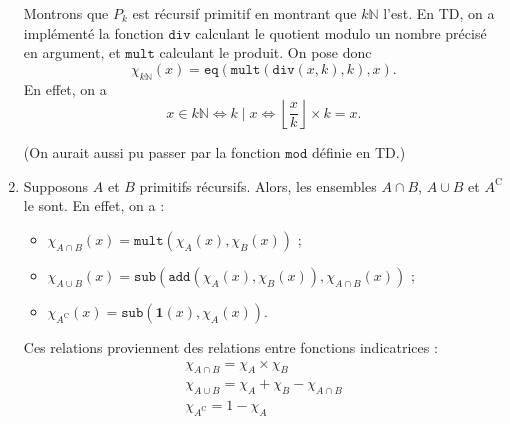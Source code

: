 \documentclass{../../notes}
\begin{document}
\begin{enumerate}
      Montrons que $P_k$ est récursif primitif en montrant que $k\mathds{N}$ l'est.
      En TD, on a implémenté la fonction $\mathtt{div}$  calculant le quotient modulo un nombre précisé en argument, et $\mathtt{mult}$ calculant le produit.
      On pose donc \[
        \chi_{k\mathds{N}}(x) = \mathtt{eq}(\mathtt{mult}(\mathtt{div}(x, k), k), x)
      .\]
      En effet, on a \[
      x \in k \mathds{N} \iff k  \mid x \iff \left\lfloor \frac{x}{k} \right\rfloor \times k = x
      .\]

      (On aurait aussi pu passer par la fonction $\mathtt{mod}$ définie en TD.)
    \item Supposons $A$ et $B$ primitifs récursifs.
      Alors, les ensembles $A \cap B$, $A \cup B$ et $A^\mathrm{C}$ le sont.
      En effet, on a :
      \begin{itemize}
        \item $\chi_{A \cap B}(x) = \mathtt{mult}(\chi_A(x), \chi_B(x))$ ;
        \item $\chi_{A \cup B}(x) = \mathtt{sub}(\mathtt{add}(\chi_A(x), \chi_B(x)), \chi_{A \cap B}(x))$ ;
        \item $\chi_{A^\mathrm{C}}(x) = \mathtt{sub}(\mathbf{1}(x), \chi_A(x))$.
      \end{itemize}
      Ces relations proviennent des relations entre fonctions indicatrices :
      \begin{gather*}
        \chi_{A \cap B} = \chi_A \times \chi_B\\
        \chi_{A \cup B} = \chi_A + \chi_B - \chi_{A \cap B}\\
        \chi_{A^\mathrm{C}} = 1 - \chi_A
      \end{gather*}


\end{enumerate}
\end{document}

